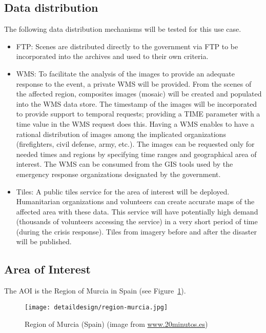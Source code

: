 \subsection{Data distribution}
The following data distribution mechanisms will be tested for this use case.
\begin{itemize}
\item \ac{FTP}: Scenes are distributed directly to the government via \ac{FTP} to be incorporated into the archives and used to their own criteria.
\item \ac{WMS}: To facilitate the analysis of the images to provide an adequate response to the event, a private \acl{WMS} will be provided. From the scenes of the affected region, composites images (mosaic) will be created and populated into the \ac{WMS} data store. The timestamp of the images will be incorporated to provide support to temporal requests; providing a TIME parameter with a time value in the WMS request does this. Having a WMS enables to have a rational distribution of images among the implicated organizations (firefighters, civil defense, army, etc.). The images can be requested only for needed times and regions by specifying time ranges and geographical area of interest. The WMS can be consumed from the GIS tools used by the emergency response organizations designated by the government.
\item Tiles: A public tiles service for the area of interest will be deployed. Humanitarian organizations and volunteers can create accurate maps of the affected area with these data. This service will have potentially high demand (thousands of volunteers accessing the service) in a very short period of time (during the crisis response). Tiles from imagery before and after the disaster will be published.
\end{itemize}

\subsection{Area of Interest} 
The \acl{AOI} is the Region of Murcia in Spain (see Figure~\ref{fig:region-murcia}). 

\begin{figure}[!h]
\begin{center}
\texttt{[image: detaildesign/region-murcia.jpg]}
\caption{Region of Murcia (Spain) (image from \url{www.20minutos.es})}
\label{fig:region-murcia}
\end{center}
\end{figure}


